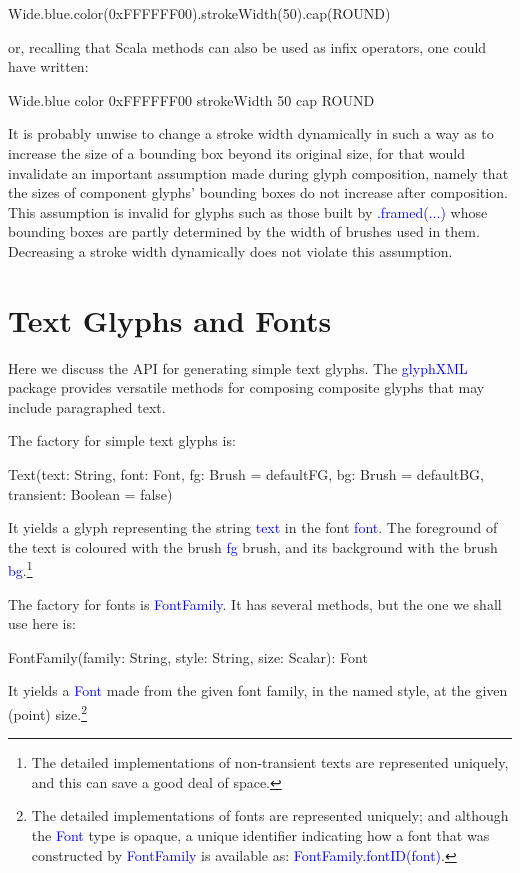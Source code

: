 \documentclass[12pt,a4paper]{article}
\def\Scala#1{\textcolor{blue}{\textsf{#1}}}
\let\scalasize=\footnotesize
\def\S#1{\section{#1}}
\begin{document}
\begin{scala}
        Wide.blue.color(0xFFFFFF00).strokeWidth(50).cap(ROUND)
\end{scala}

or, recalling that \textsf{Scala} methods can also be used as infix operators, one could
have written:

\begin{scala}
        Wide.blue color 0xFFFFFF00 strokeWidth 50 cap ROUND
\end{scala}

It is probably unwise to change a stroke width dynamically in such a
way as to increase the size of a bounding box beyond its original
size, for that would invalidate an important assumption made during glyph
composition, namely that the sizes of component glyphs' bounding
boxes do not increase after composition.  This assumption is invalid
for glyphs such as those built by \Scala{.framed(...)} whose
bounding boxes are partly determined by the width of  brushes used
in them. Decreasing a stroke width dynamically does not violate
this assumption.

\clearpage


\S{Text Glyphs and Fonts}
Here we discuss the API for generating simple text glyphs.
{The \textcolor{blue}{\textsf{glyphXML}}
package provides versatile methods for composing composite glyphs that
may include paragraphed text.}

The factory for simple text glyphs is:
\let\scalasize=\footnotesize
\begin{scala}
     Text(text:      String,
          font:      Font,
          fg:        Brush   = defaultFG,
          bg:        Brush   = defaultBG,
          transient: Boolean = false)
\end{scala}

It yields a glyph representing the string \Scala{text} in the font \Scala{font}. The
foreground of the text is coloured with the brush \Scala{fg} brush, and
its background with the brush \Scala{bg}.\footnote{The detailed
implementations of non-transient texts are represented uniquely, and this
can save a good deal of space.}

The factory for fonts is \Scala{FontFamily}. It has several methods, but
the one we shall use here is:
\begin{scala}
  FontFamily(family: String, style: String, size: Scalar): Font
\end{scala}
It yields a \Scala{Font} made from the given font family, in the named style, at
the given (point) size.\footnote{The detailed implementations of fonts
are represented uniquely; and although the \Scala{Font} type is
opaque, a unique identifier indicating how a font that was
constructed by \Scala{FontFamily} is available as:
\Scala{FontFamily.fontID(font)}.}
\end{document}
